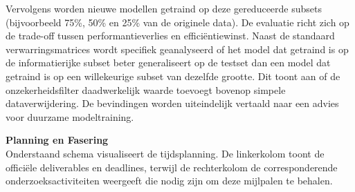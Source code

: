 Vervolgens worden nieuwe modellen getraind op deze gereduceerde subsets (bijvoorbeeld 75\%, 50\% en 25\% van de originele data). De evaluatie richt zich op de trade-off tussen performantieverlies en efficiëntiewinst. Naast de standaard verwarringsmatrices wordt specifiek geanalyseerd of het model dat getraind is op de informatierijke \newline subset beter generaliseert op de testset dan een model dat getraind is op een willekeurige subset van dezelfde grootte. Dit toont aan of de onzekerheidsfilter daadwerkelijk waarde toevoegt bovenop simpele dataverwijdering. De bevindingen worden uiteindelijk vertaald naar een advies voor duurzame modeltraining.

\vspace{2em}

\noindent \textbf{Planning en Fasering} \\
Onderstaand schema visualiseert de tijdsplanning. De linkerkolom toont de officiële deliverables en deadlines, terwijl de rechterkolom de corresponderende onderzoeksactiviteiten weergeeft die nodig zijn om deze mijlpalen te behalen.

